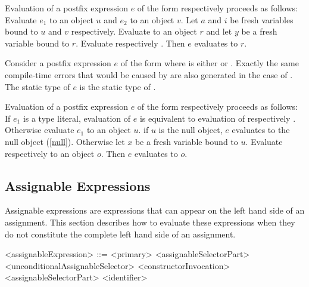 \documentclass[makeidx]{article}
\begin{document}
{\LMHash{}%
Evaluation of a postfix expression $e$
of the form  respectively 
proceeds as follows:
Evaluate $e_1$ to an object $u$ and $e_2$ to an object $v$.
Let $a$ and $i$ be fresh variables bound to $u$ and $v$ respectively.
Evaluate  to an object $r$
and let $y$ be a fresh variable bound to $r$.
Evaluate  respectively .
Then $e$ evaluates to $r$.
\EndCase

\LMHash{}%
Consider a postfix expression $e$ of the form 
where \op{} is either \lit{++} or \lit{-{}-}.
Exactly the same compile-time errors that would be caused by 
are also generated in the case of .
The static type of $e$ is the static type of .

\LMHash{}%
Evaluation of a postfix expression $e$
of the form  respectively 
proceeds as follows:
If $e_1$ is a type literal, evaluation of $e$ is equivalent to
evaluation of  respectively .
Otherwise evaluate $e_1$ to an object $u$.
if $u$ is the null object, $e$ evaluates to the null object (\ref{null}).
Otherwise let $x$ be a fresh variable bound to $u$.
Evaluate  respectively  to an object $o$.
Then $e$ evaluates to $o$.
\EndCase


\subsection{Assignable Expressions}

\LMHash{}%
Assignable expressions are expressions that can appear on the left hand side of an assignment.
This section describes how to evaluate these expressions when they do not constitute the complete left hand side of an assignment.


\begin{grammar}
<assignableExpression> ::= <primary> <assignableSelectorPart>
  \alt \SUPER{} <unconditionalAssignableSelector>
  \alt <constructorInvocation> <assignableSelectorPart>
  \alt <identifier>


\end{grammar}}
\end{document}
